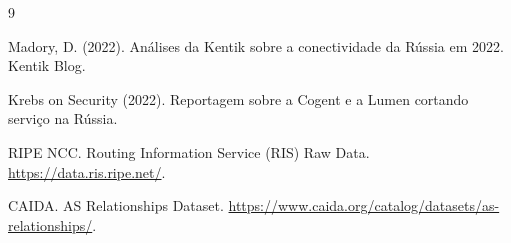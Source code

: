 \documentclass[12pt]{article}
\begin{document}
\begin{thebibliography}{9}

Madory, D. (2022). Análises da Kentik sobre a conectividade da Rússia em 2022. Kentik Blog.

Krebs on Security (2022). Reportagem sobre a Cogent e a Lumen cortando serviço na Rússia.

RIPE NCC. Routing Information Service (RIS) Raw Data. \url{https://data.ris.ripe.net/}.

CAIDA. AS Relationships Dataset. \url{https://www.caida.org/catalog/datasets/as-relationships/}.

\end{thebibliography}
\end{document}
